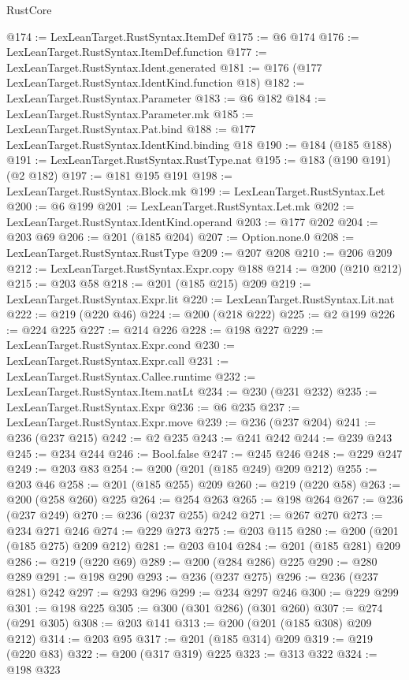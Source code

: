 \begin{lexlean}{RustCore}
\begin{coremodule}
@174 := LexLeanTarget.RustSyntax.ItemDef
@175 := @6 @174
@176 := LexLeanTarget.RustSyntax.ItemDef.function
@177 := LexLeanTarget.RustSyntax.Ident.generated
@181 := @176 (@177 LexLeanTarget.RustSyntax.IdentKind.function @18)
@182 := LexLeanTarget.RustSyntax.Parameter
@183 := @6 @182
@184 := LexLeanTarget.RustSyntax.Parameter.mk
@185 := LexLeanTarget.RustSyntax.Pat.bind
@188 := @177 LexLeanTarget.RustSyntax.IdentKind.binding @18
@190 := @184 (@185 @188)
@191 := LexLeanTarget.RustSyntax.RustType.nat
@195 := @183 (@190 @191) (@2 @182)
@197 := @181 @195 @191
@198 := LexLeanTarget.RustSyntax.Block.mk
@199 := LexLeanTarget.RustSyntax.Let
@200 := @6 @199
@201 := LexLeanTarget.RustSyntax.Let.mk
@202 := LexLeanTarget.RustSyntax.IdentKind.operand
@203 := @177 @202
@204 := @203 @69
@206 := @201 (@185 @204)
@207 := Option.none.{0}
@208 := LexLeanTarget.RustSyntax.RustType
@209 := @207 @208
@210 := @206 @209
@212 := LexLeanTarget.RustSyntax.Expr.copy @188
@214 := @200 (@210 @212)
@215 := @203 @58
@218 := @201 (@185 @215) @209
@219 := LexLeanTarget.RustSyntax.Expr.lit
@220 := LexLeanTarget.RustSyntax.Lit.nat
@222 := @219 (@220 @46)
@224 := @200 (@218 @222)
@225 := @2 @199
@226 := @224 @225
@227 := @214 @226
@228 := @198 @227
@229 := LexLeanTarget.RustSyntax.Expr.cond
@230 := LexLeanTarget.RustSyntax.Expr.call
@231 := LexLeanTarget.RustSyntax.Callee.runtime
@232 := LexLeanTarget.RustSyntax.Item.natLt
@234 := @230 (@231 @232)
@235 := LexLeanTarget.RustSyntax.Expr
@236 := @6 @235
@237 := LexLeanTarget.RustSyntax.Expr.move
@239 := @236 (@237 @204)
@241 := @236 (@237 @215)
@242 := @2 @235
@243 := @241 @242
@244 := @239 @243
@245 := @234 @244
@246 := Bool.false
@247 := @245 @246
@248 := @229 @247
@249 := @203 @83
@254 := @200 (@201 (@185 @249) @209 @212)
@255 := @203 @46
@258 := @201 (@185 @255) @209
@260 := @219 (@220 @58)
@263 := @200 (@258 @260) @225
@264 := @254 @263
@265 := @198 @264
@267 := @236 (@237 @249)
@270 := @236 (@237 @255) @242
@271 := @267 @270
@273 := @234 @271 @246
@274 := @229 @273
@275 := @203 @115
@280 := @200 (@201 (@185 @275) @209 @212)
@281 := @203 @104
@284 := @201 (@185 @281) @209
@286 := @219 (@220 @69)
@289 := @200 (@284 @286) @225
@290 := @280 @289
@291 := @198 @290
@293 := @236 (@237 @275)
@296 := @236 (@237 @281) @242
@297 := @293 @296
@299 := @234 @297 @246
@300 := @229 @299
@301 := @198 @225
@305 := @300 (@301 @286) (@301 @260)
@307 := @274 (@291 @305)
@308 := @203 @141
@313 := @200 (@201 (@185 @308) @209 @212)
@314 := @203 @95
@317 := @201 (@185 @314) @209
@319 := @219 (@220 @83)
@322 := @200 (@317 @319) @225
@323 := @313 @322
@324 := @198 @323

\end{coremodule}
\end{lexlean}
